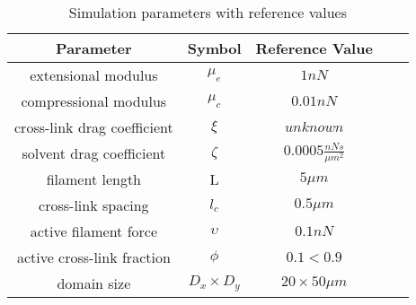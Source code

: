 \documentclass[10pt,letterpaper]{article}
\providecommand{\DIFaddtex}[1]{{\protect\color{blue}\uwave{#1}}} %
\providecommand{\DIFdeltex}[1]{{\protect\color{red}\sout{#1}}}                      %
\providecommand{\DIFaddFL}[1]{\DIFadd{#1}} %
\providecommand{\DIFdelFL}[1]{\DIFdel{#1}} %
\providecommand{\DIFaddbeginFL}{} %
\providecommand{\DIFaddendFL}{} %
\providecommand{\DIFdelbeginFL}{} %
\providecommand{\DIFdelendFL}{} %
\providecommand{\DIFadd}[1]{\texorpdfstring{\DIFaddtex{#1}}{#1}} %
\providecommand{\DIFdel}[1]{\texorpdfstring{\DIFdeltex{#1}}{}} %
\begin{document}
\begin{table}[h]
\centering
\caption{Simulation parameters with reference values}
\label{table:para}
\begin{tabular}{|c|c|c|c|c|}
\hline
{\bf Parameter}             & {\bf Symbol} & {\bf Reference Value}          \\ \hline
extensional modulus         & $\mu_e$        & $1 nN $                                               \\
compressional modulus             & $\mu_c$     & $ 0.01 nN $                           \\
cross-link drag coefficient & $\xi$      & \DIFdelbeginFL \DIFdelFL{$unknown $              }\DIFdelendFL \DIFaddbeginFL \DIFaddFL{$ 1 \frac{pN s}{\mu m} $              }\DIFaddendFL \\
solvent drag coefficient     & $\zeta$        & $0.0005 \frac{nN s}{\mu m^2} $      \\
filament length             & L            & \DIFdelbeginFL \DIFdelFL{$5 \mu m$                                          }\DIFdelendFL \DIFaddbeginFL \DIFaddFL{$1-5 \mu m$                                          }\DIFaddendFL \\
cross-link spacing          & $l_c$        & $0.5 \mu m$                                         \\
active filament force          & $\upsilon$        & $0.1 nN$                                         \\
active cross-link fraction          & $\phi$        & \DIFdelbeginFL \DIFdelFL{$0.1<0.9$                                         }\DIFdelendFL \DIFaddbeginFL \DIFaddFL{$0.1-0.9$                                         }\DIFaddendFL \\
domain size                 & $D_x\times D_y$            & $20\times 50 \mu m$                                 \\ \hline
\end{tabular}
\end{table}



\end{document}
